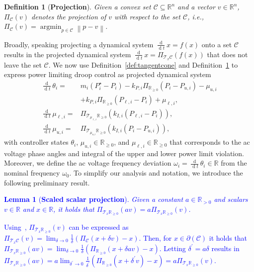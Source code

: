 \documentclass[twocolumn,twoside,journal]{IEEEtran}
\DeclareMathOperator{\diff}{d}
\DeclareMathOperator*{\argmin}{argmin}
\newcommand{\mc}{\mathcal}
\newcommand{\ddt}{\tfrac{\diff}{\diff \!t}}
\newcommand{\norm}[1]{\left \lVert #1 \right \rVert}
\newtheorem{lemma}{Lemma}
\newtheorem{definition}{Definition}
\begin{document}
\begin{definition}[\textbf{Projection}]\label{def:projection}
    Given a convex set $\mathcal{C} \subseteq \mathbb{R}^n$ and a vector $v \in \mathbb{R}^n$, $\Pi_{\mathcal{C}}(v)$ denotes the projection of $v$ with respect to the set $\mathcal{C}$, i.e., $\Pi_{\mathcal{C}}(v) = \argmin\nolimits_{p \in \mathcal{C}} \norm{p - v}$.
\end{definition}
%
Broadly, speaking projecting a dynamical system $\ddt x = f(x)$ onto a  set $\mc C$ results in the projected dynamical system $\ddt x = \Pi_{\mathcal{T}_{x}\mathcal{C}}(f(x))$ that does not leave the set $\mc C$. %
We now use Definition~\ref{def:tangentcone} and Definition~\ref{def:projection} to express power limiting droop control as projected dynamical system 
%
\begin{subequations}\label{eq:plimdroopprime}
    \begin{align}
       \ddt \theta_i =& m_i (P^\star_i-P_i)\! -\! k_{P,i} \Pi_{{\mathbb{R}}_{\geq 0}}(P_i-P_{u,i}) - \mu_{u,i}\\ &+ k_{P,i} \Pi_{{\mathbb{R}}_{\geq 0} }(P_{\ell,i} - P_i) + \mu_{\ell,i}, \nonumber\\
    \ddt\mu_{\ell,i} =&  \Pi_{\mathcal{T}_{\mu_{\ell,i}} \mathbb{R}_{\geq 0}} \left(k_{I,i} (P_{\ell,i} - P_i)\right),\\
    \ddt\mu_{u,i} =&  \Pi_{\mathcal{T}_{\mu_{u,i}} \mathbb{R}_{\geq 0}} \left(k_{I,i} (P_i - P_{u,i})\right),
    \end{align}
\end{subequations}
with controller states $\theta_i$,  $\mu_{u,i} \in \mathbb{R}_{\geq 0}$, and $\mu_{\ell,i} \in \mathbb{R}_{\geq 0}$ that corresponds to the ac voltage phase angles and integral of the upper and lower power limit violation. Moreover, we define the ac voltage frequency deviation $\omega_i = \ddt \theta_i \in \mathbb{R}$ from the nominal frequency $\omega_0$. To simplify our analysis and notation, we introduce the following preliminary result.
%
\textcolor{blue}{\begin{lemma}[\textbf{Scaled scalar projection}]\label{lem:proj}
        Given a constant $a \in \mathbb{R}_{>0}$ and scalars $v \in \mathbb{R}$ and $x \in \mathbb{R}$, it holds that $\Pi_{\mathcal{T}_{x} \mathbb{R}_{\geq 0}}(a v) = a \Pi_{\mathcal{T}_{x} \mathbb{R}_{\geq 0}}(v)$.
    \end{lemma}
    \begin{IEEEproof}
        Using~\cite[Prop.~5.3.5]{jean}, $\Pi_{\mathcal{T}_{x} \mathbb{R}_{\geq 0}}(v)$ can be expressed as $\Pi_{\mathcal{T}_{x}\mathcal{C}}(v) = \lim_{\delta \to 0} \frac{1}{\delta} (\Pi_{\mathcal{C}}(x+\delta v) - x)$. Then, for $x \in \partial(\mathcal{C})$ it holds that $\Pi_{\mathcal{T}_{x} \mathbb{R}_{\geq 0}}(a v) = \lim_{\delta \to 0} \frac{1}{\delta}(\Pi_{\mathbb{R}_{\geq 0}}(x+\delta a v) - x)$. Letting $\delta^\prime=a \delta$ results in
        $\Pi_{\mathcal{T}_{x} \mathbb{R}_{\geq 0}}(a v) =a \lim_{\delta^\prime \to 0} \frac{1}{\delta^\prime} (\Pi_{\mathbb{R}_{\geq 0}}(x+\delta^\prime v) - x)=a \Pi_{\mathcal{T}_{x} \mathbb{R}_{\geq 0}}(v)$.
    \end{IEEEproof}
    }
\end{document}

